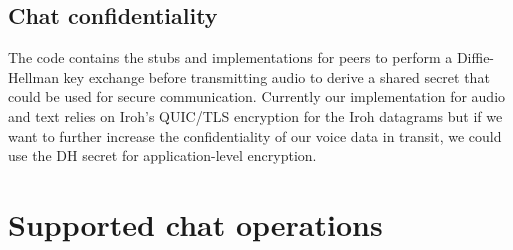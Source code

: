 \documentclass{article} %
\begin{document}
\subsection{Chat confidentiality}

The code contains the stubs and implementations for peers to perform a Diffie-Hellman key exchange before transmitting audio to derive a shared secret that could be used for
secure communication. Currently our implementation for audio and text relies on Iroh's QUIC/TLS encryption for the Iroh datagrams \cite{iroh} but if we want to further increase the confidentiality of our voice data in transit, we could use the DH secret for application-level encryption.

\section{Supported chat operations}
\end{document}
